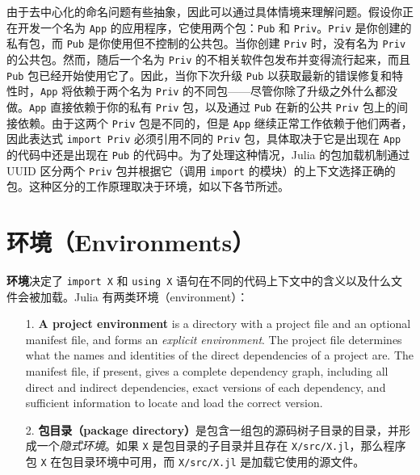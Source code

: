 由于去中心化的命名问题有些抽象，因此可以通过具体情境来理解问题。假设你正在开发一个名为 \texttt{App} 的应用程序，它使用两个包：\texttt{Pub} 和 \texttt{Priv}。\texttt{Priv} 是你创建的私有包，而 \texttt{Pub} 是你使用但不控制的公共包。当你创建 \texttt{Priv} 时，没有名为 \texttt{Priv} 的公共包。然而，随后一个名为 \texttt{Priv} 的不相关软件包发布并变得流行起来，而且 \texttt{Pub} 包已经开始使用它了。因此，当你下次升级 \texttt{Pub} 以获取最新的错误修复和特性时，\texttt{App} 将依赖于两个名为 \texttt{Priv} 的不同包——尽管你除了升级之外什么都没做。\texttt{App} 直接依赖于你的私有 \texttt{Priv} 包，以及通过 \texttt{Pub} 在新的公共 \texttt{Priv} 包上的间接依赖。由于这两个 \texttt{Priv} 包是不同的，但是 \texttt{App} 继续正常工作依赖于他们两者，因此表达式 \texttt{import Priv} 必须引用不同的 \texttt{Priv} 包，具体取决于它是出现在 \texttt{App} 的代码中还是出现在 \texttt{Pub} 的代码中。为了处理这种情况，Julia 的包加载机制通过 UUID 区分两个 \texttt{Priv} 包并根据它（调用 \texttt{import} 的模块）的上下文选择正确的包。这种区分的工作原理取决于环境，如以下各节所述。



\hypertarget{3001628692617530434}{}


\section{环境（Environments）}



\textbf{环境}决定了 \texttt{import X} 和 \texttt{using X} 语句在不同的代码上下文中的含义以及什么文件会被加载。Julia 有两类环境（environment）：



\begin{itemize}
\item[1. ] \textbf{A project environment} is a directory with a project file and an optional manifest file, and forms an \emph{explicit environment}. The project file determines what the names and identities of the direct dependencies of a project are. The manifest file, if present, gives a complete dependency graph, including all direct and indirect dependencies, exact versions of each dependency, and sufficient information to locate and load the correct version.


\item[2. ] \textbf{包目录（package directory）}是包含一组包的源码树子目录的目录，并形成一个\emph{隐式环境}。如果 \texttt{X} 是包目录的子目录并且存在 \texttt{X/src/X.jl}，那么程序包 \texttt{X} 在包目录环境中可用，而 \texttt{X/src/X.jl} 是加载它使用的源文件。

\end{itemize}


